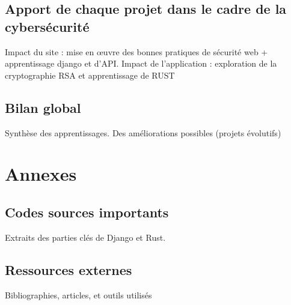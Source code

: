 \documentclass[12pt]{article} %
\begin{document}
	\subsection{Apport de chaque projet dans le cadre de la cybersécurité}
		Impact du site : mise en œuvre des bonnes pratiques de sécurité web + apprentissage django et d’API.
Impact de l’application : exploration de la cryptographie RSA et apprentissage de RUST
	
	
	
	\subsection{Bilan global}
		Synthèse des apprentissages.
Des améliorations possibles (projets évolutifs)


\newpage
\section*{Annexes}
	\subsection{Codes sources importants}
		Extraits des parties clés de Django et Rust.
	\subsection{Ressources externes}
		Bibliographies, articles, et outils utilisés
\end{document}
